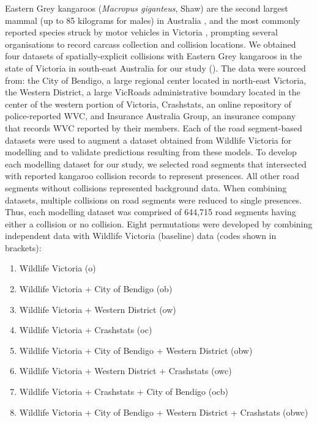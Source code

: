 Eastern Grey kangaroos (\textit{Macropus giganteus}, Shaw) are the second largest mammal (up to 85 kilograms for males) in Australia \citep{coul10}, and the most commonly reported species struck by motor vehicles in Victoria \citep{rowd08}, prompting several organisations to record carcass collection and collision locations. We obtained four datasets of spatially-explicit collisions with Eastern Grey kangaroos in the state of Victoria in south-east Australia for our study (). The data were sourced from: the City of Bendigo, a large regional center located in north-east Victoria, the Western District, a large VicRoads administrative boundary located in the center of the western portion of Victoria, Crashstats, an online repository of police-reported WVC, and Insurance Australia Group, an insurance company that records WVC reported by their members.  Each of the road segment-based datasets were used to augment a dataset obtained from Wildlife Victoria for modelling and to validate predictions resulting from these models. To develop each modelling dataset for our study, we selected road segments that intersected with reported kangaroo collision records to represent presences. All other road segments without collisions represented background data. When combining datasets, multiple collisions on road segments were reduced to single presences. Thus, each modelling dataset was comprised of 644,715 road segments having either a collision or no collision. Eight permutations were developed by combining independent data with Wildlife Victoria (baseline) data (codes shown in brackets):

\begin{enumerate}
	\item Wildlife Victoria (o)
	\item Wildlife Victoria + City of Bendigo (ob)
	\item Wildlife Victoria + Western District (ow)
	\item Wildlife Victoria + Crashstats (oc)
	\item Wildlife Victoria + City of Bendigo + Western District (obw)
	\item Wildlife Victoria + Western District + Crashstats (owc)
	\item Wildlife Victoria + Crashstats + City of Bendigo (ocb)
	\item Wildlife Victoria + City of Bendigo + Western District + Crashstats (obwc)
\end{enumerate}

